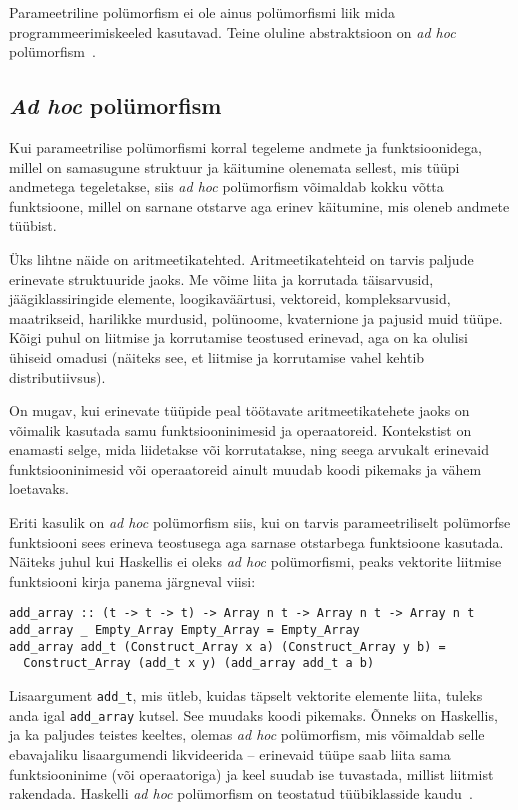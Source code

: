 \documentclass[12pt]{article}
\begin{document}
    Parameetriline polümorfism ei ole ainus polümorfismi liik mida programmeerimiskeeled kasutavad. Teine oluline abstraktsioon on \textit{ad hoc} polümorfism~\cite{Fun}.
    \subsection{\textit{Ad hoc} polümorfism}
      Kui parameetrilise polümorfismi korral tegeleme andmete ja funktsioonidega, millel on samasugune struktuur ja käitumine olenemata sellest, mis tüüpi andmetega tegeletakse, siis \textit{ad hoc} polümorfism võimaldab kokku võtta funktsioone, millel on sarnane otstarve aga erinev käitumine, mis oleneb andmete tüübist.

      Üks lihtne näide on aritmeetikatehted. Aritmeetikatehteid on tarvis paljude erinevate struktuuride jaoks. Me võime liita ja korrutada täisarvusid, jäägiklassiringide elemente, loogikaväärtusi, vektoreid, kompleksarvusid, maatrikseid, harilikke murdusid, polünoome, kvaternione ja pajusid muid tüüpe. Kõigi puhul on liitmise ja korrutamise teostused erinevad, aga on ka olulisi ühiseid omadusi (näiteks see, et liitmise ja korrutamise vahel kehtib distributiivsus).

      On mugav, kui erinevate tüüpide peal töötavate aritmeetikatehete jaoks on võimalik kasutada samu funktsiooninimesid ja operaatoreid. Kontekstist on enamasti selge, mida liidetakse või korrutatakse, ning seega arvukalt erinevaid funktsiooninimesid või operaatoreid ainult muudab koodi pikemaks ja vähem loetavaks.

      Eriti kasulik on \textit{ad hoc} polümorfism siis, kui on tarvis parameetriliselt polümorfse funktsiooni sees erineva teostusega aga sarnase otstarbega funktsioone kasutada. Näiteks juhul kui Haskellis ei oleks \textit{ad hoc} polümorfismi, peaks vektorite liitmise funktsiooni kirja panema järgneval viisi:

      \begin{verbatim}add_array :: (t -> t -> t) -> Array n t -> Array n t -> Array n t
add_array _ Empty_Array Empty_Array = Empty_Array
add_array add_t (Construct_Array x a) (Construct_Array y b) =
  Construct_Array (add_t x y) (add_array add_t a b)\end{verbatim}

    Lisaargument \verb!add_t!, mis ütleb, kuidas täpselt vektorite elemente liita, tuleks anda igal \verb!add_array! kutsel. See muudaks koodi pikemaks. Õnneks on Haskellis, ja ka paljudes teistes keeltes, olemas \textit{ad hoc} polümorfism, mis võimaldab selle ebavajaliku lisaargumendi likvideerida -- erinevaid tüüpe saab liita sama funktsiooninime (või operaatoriga) ja keel suudab ise tuvastada, millist liitmist rakendada. Haskelli \textit{ad hoc} polümorfism on teostatud tüübiklasside kaudu~\cite{How}.
\end{document}
